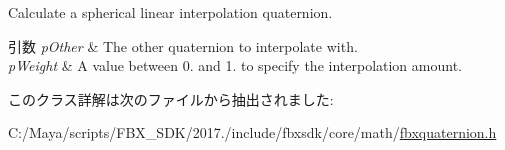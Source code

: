 Calculate a spherical linear interpolation quaternion. 
\begin{DoxyParams}{引数}
{\em p\+Other} & The other quaternion to interpolate with. \\
\hline
{\em p\+Weight} & A value between 0. and 1. to specify the interpolation amount. \\
\hline
\end{DoxyParams}


このクラス詳解は次のファイルから抽出されました\+:\begin{DoxyCompactItemize}
\item 
C\+:/\+Maya/scripts/\+F\+B\+X\+\_\+\+S\+D\+K/2017./include/fbxsdk/core/math/\hyperlink{fbxquaternion_8h}{fbxquaternion.\+h}\end{DoxyCompactItemize}
